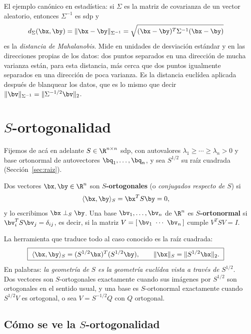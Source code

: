\begin{remark}
El ejemplo canónico en estadística: si $\Sigma$ es la matriz de covarianza de
un vector aleatorio, entonces $\Sigma^{-1}$ es sdp y
\[
d_{\Sigma}(\bx,\by)=\|\bx-\by\|_{\Sigma^{-1}}
=\sqrt{(\bx-\by)^T\Sigma^{-1}(\bx-\by)}
\]
es la \emph{distancia de Mahalanobis}. Mide en unidades de desviación
estándar y en las direcciones propias de los datos: dos puntos separados en
una dirección de mucha varianza están, para esta distancia, más cerca que dos
puntos igualmente separados en una dirección de poca varianza. Es la
distancia euclídea aplicada después de blanquear los datos, que es lo mismo
que decir $\|\bv\|_{\Sigma^{-1}}=\|\Sigma^{-1/2}\bv\|_2$.
\end{remark}

\section{$S$-ortogonalidad}
\label{sec:S-ortogonalidad}

Fijemos de acá en adelante $S\in\R^{n\times n}$ sdp, con autovalores
$\lambda_1\ge\cdots\ge\lambda_n>0$ y base ortonormal de autovectores
$\bq_1,\dots,\bq_n$, y sea $S^{1/2}$ su raíz cuadrada
(Sección~\ref{sec:raiz}).

\begin{definition}
Dos vectores $\bx,\by\in\R^n$ son \textbf{$S$-ortogonales} (o
\emph{conjugados respecto de $S$}) si
\[
\langle\bx,\by\rangle_S=\bx^TS\by=0 ,
\]
y lo escribimos $\bx\perp_S\by$. Una base $\bv_1,\dots,\bv_n$ de $\R^n$ es
\textbf{$S$-ortonormal} si $\bv_i^TS\bv_j=\delta_{ij}$, es decir, si la
matriz $V=[\,\bv_1\ \cdots\ \bv_n\,]$ cumple $V^TSV=I$.
\end{definition}

La herramienta que traduce todo al caso conocido es la raíz cuadrada:
\begin{equation}\label{eq:traduccion-S}
\boxed{\ \langle\bx,\by\rangle_S=(S^{1/2}\bx)^T(S^{1/2}\by),
\qquad
\|\bx\|_S=\|S^{1/2}\bx\|_2 .\ }
\end{equation}
En palabras: \emph{la geometría de $S$ es la geometría euclídea vista a
través de $S^{1/2}$}. Dos vectores son $S$-ortogonales exactamente cuando sus
imágenes por $S^{1/2}$ son ortogonales en el sentido usual, y una base es
$S$-ortonormal exactamente cuando $S^{1/2}V$ es ortogonal, o sea
$V=S^{-1/2}Q$ con $Q$ ortogonal.

\subsection{Cómo se ve la $S$-ortogonalidad}


